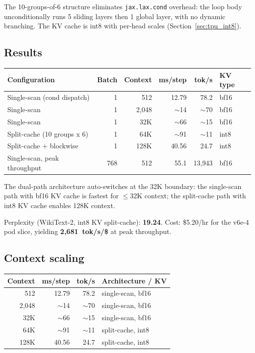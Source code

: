 The 10-groups-of-6 structure eliminates \texttt{jax.lax.cond} overhead:
the loop body unconditionally runs 5 sliding layers then 1 global layer,
with no dynamic branching. The KV cache is int8 with per-head scales
(Section~\ref{sec:tpu_int8}).

\subsection{Results}

\begin{tabular}{lrrrrl}
\toprule
\textbf{Configuration} & \textbf{Batch} & \textbf{Context} & \textbf{ms/step} & \textbf{tok/s} & \textbf{KV type} \\
\midrule
Single-scan (cond dispatch)   & 1   & 512     & 12.79  & 78.2    & bf16 \\
Single-scan                   & 1   & 2{,}048 & $\sim$14  & $\sim$70    & bf16 \\
Single-scan                   & 1   & 32K     & $\sim$66  & $\sim$15    & bf16 \\
Split-cache (10 groups x 6)   & 1   & 64K     & $\sim$91  & $\sim$11    & int8 \\
Split-cache + blockwise       & 1   & 128K    & 40.56  & 24.7    & int8 \\
Single-scan, peak throughput  & 768 & 512     & 55.1   & 13{,}943 & bf16 \\
\bottomrule
\end{tabular}

\vspace{0.5em}
\noindent The dual-path architecture auto-switches at the 32K boundary:
the single-scan path with bf16 KV cache is fastest for $\le$32K context;
the split-cache path with int8 KV cache enables 128K context.

\vspace{0.5em}
\noindent Perplexity (WikiText-2, int8 KV split-cache): \textbf{19.24}.
Cost: \$5.20/hr for the v6e-4 pod slice, yielding
\textbf{2{,}681~tok/s/\$} at peak throughput.

\subsection{Context scaling}

\begin{tabular}{rrrl}
\toprule
\textbf{Context} & \textbf{ms/step} & \textbf{tok/s} & \textbf{Architecture / KV} \\
\midrule
512     & 12.79  & 78.2  & single-scan, bf16 \\
2{,}048 & $\sim$14   & $\sim$70   & single-scan, bf16 \\
32K     & $\sim$66   & $\sim$15   & single-scan, bf16 \\
64K     & $\sim$91   & $\sim$11   & split-cache, int8 \\
128K    & 40.56  & 24.7  & split-cache, int8 \\
\bottomrule
\end{tabular}

